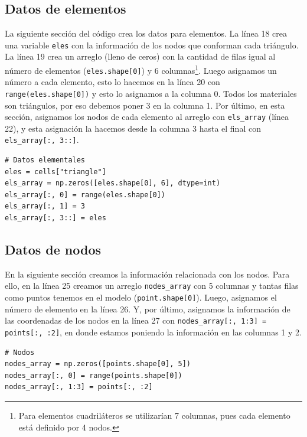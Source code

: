 \documentclass[12pt,letterpaper]{article}
\newcommand{\mintpy}[1]{\texttt{#1}}
\begin{document}
\subsection{Datos de elementos}
La siguiente sección del código crea los datos para elementos. La línea 18 crea una variable \texttt{eles} con la información de los nodos que conforman cada triángulo. La línea 19 crea un arreglo (lleno de ceros) con la cantidad de filas igual al número de elementos (\mintpy{eles.shape[0]}) y 6 columnas\footnote{Para elementos cuadriláteros se utilizarían 7 columnas, pues cada elemento está definido por 4 nodos.}. Luego asignamos un número a cada elemento, esto lo hacemos en la línea 20 con \mintpy{range(eles.shape[0])} y esto lo asignamos a la columna 0. Todos los materiales son triángulos, por eso debemos poner 3 en la columna 1. Por último, en esta sección, asignamos los nodos de cada elemento al arreglo con \mintpy{els_array} (línea 22), y esta asignación la hacemos desde la columna 3 hasta el final con \mintpy{els_array[:, 3::]}.
\begin{verbatim}
# Datos elementales
eles = cells["triangle"]
els_array = np.zeros([eles.shape[0], 6], dtype=int)
els_array[:, 0] = range(eles.shape[0])
els_array[:, 1] = 3
els_array[:, 3::] = eles
\end{verbatim}

\subsection{Datos de nodos}
En la siguiente sección creamos la información relacionada con los nodos. Para ello, en la línea 25 creamos un arreglo \mintpy{nodes_array} con 5 columnas y tantas filas como puntos tenemos en el modelo (\mintpy{point.shape[0]}). Luego, asignamos el número de elemento en la línea 26. Y, por último, asignamos la información de las coordenadas de los nodos en la línea 27 con \mintpy{nodes_array[:, 1:3] = points[:, :2]}, en donde estamos poniendo la información en las columnas 1 y 2.
\begin{verbatim}
# Nodos
nodes_array = np.zeros([points.shape[0], 5])
nodes_array[:, 0] = range(points.shape[0])
nodes_array[:, 1:3] = points[:, :2]
\end{verbatim}
\end{document}

